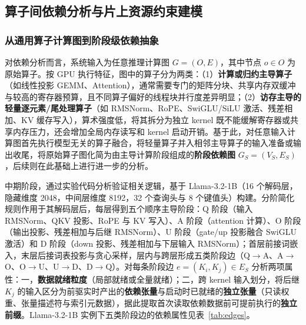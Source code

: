 
\subsection{算子间依赖分析与片上资源约束建模}\label{sec:dep}\label{sec:abs}

\subsubsection{从通用算子计算图到阶段级依赖抽象}\label{sec:form}

对依赖分析而言，系统输入为任意推理计算图 $G=(O,E)$，其中节点 $o\in O$ 为原始算子。按 GPU 执行特征，图中的算子分为两类：（1）\textbf{计算或归约主导算子}（如线性投影 GEMM、Attention），通常需要专门的矩阵分块、共享内存双缓冲与较高的寄存器预算，且不同算子偏好的线程块并行度差异明显；（2）\textbf{访存主导的轻量逐元素/尾处理算子}（如 RMSNorm、RoPE、SwiGLU/SiLU 激活、残差相加、KV 缓存写入），算术强度低，将其拆分为独立 kernel 既不能缓解寄存器或共享内存压力，还会增加全局内存读写和 kernel 启动开销。基于此，对任意输入计算图首先执行模型无关的算子融合，将轻量算子并入相邻主导算子的输入准备或输出收尾，将原始算子图化简为由主导计算阶段组成的\textbf{阶段依赖图} $G_S=(V_S,E_S)$，后续则在此基础上进行进一步的分析。

中期阶段，通过实验代码分析验证相关逻辑，基于 Llama-3.2-1B（16 个解码层，隐藏维度 2048，中间层维度 8192，32 个查询头与 8 个键值头）构建。分阶简化规则作用于其解码层后，每层得到五个顺序主导阶段：Q 阶段（输入 RMSNorm、QKV 投影、RoPE 与 KV 写入）、A 阶段（attention 计算）、O 阶段（输出投影、残差相加与后继 RMSNorm）、U 阶段（gate/up 投影融合 SwiGLU 激活）和 D 阶段（down 投影、残差相加与下层输入 RMSNorm）；首层前接词嵌入，末层后接词表投影与贪心采样，层内与跨层形成五类阶段边（Q$\to$A、A$\to$O、O$\to$U、U$\to$D、D$\to$Q）。对每条阶段边 $e=(K_i,K_j)\in E_S$ 分析两项属性：一，\textbf{数据就绪粒度}（局部就绪或全量就绪）；二，跨 kernel 输入划分，将后继 $K_j$ 的输入区分为前驱实时产出的\textbf{依赖张量}与启动时已就绪的\textbf{独立张量}（只读权重、张量描述符与索引元数据），据此提取首次读取依赖数据前可提前执行的\textbf{独立前缀}。Llama-3.2-1B 实例下五类阶段边的依赖属性见表~\ref{tab:edges}。

